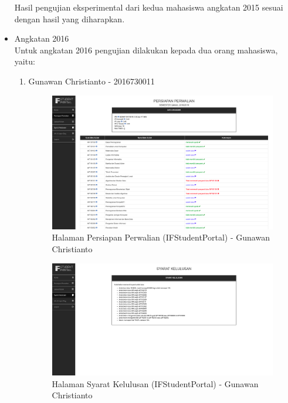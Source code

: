 \begin{itemize}
\begin{enumerate}
	\end{enumerate}
	Hasil pengujian eksperimental dari kedua mahasiswa angkatan 2015 sesuai dengan hasil yang diharapkan.
	\item Angkatan 2016 \\
	Untuk angkatan 2016 pengujian dilakukan kepada dua orang mahasiswa, yaitu:
	\begin{enumerate}
		\item Gunawan Christianto - 2016730011 \\
		\begin{figure}[H]
			\centering
			\includegraphics[scale=0.25]{Gambar/HasilPengujian/2016_1_persiapan_perwalian_ifstudentportal}
			\caption{Halaman Persiapan Perwalian (IFStudentPortal) - Gunawan Christianto}
			\label{fig:2016_1_persiapan_perwalian_ifstudentportal}
		\end{figure}
		\begin{figure}[H]
			\centering
			\includegraphics[scale=0.25]{Gambar/HasilPengujian/2016_1_syarat_kelulusan_ifstudentportal}
			\caption{Halaman Syarat Kelulusan (IFStudentPortal) - Gunawan Christianto}
			\label{fig:2016_1_syarat_kelulusan_ifstudentportal}

\end{figure}
\end{enumerate}
\end{itemize}
